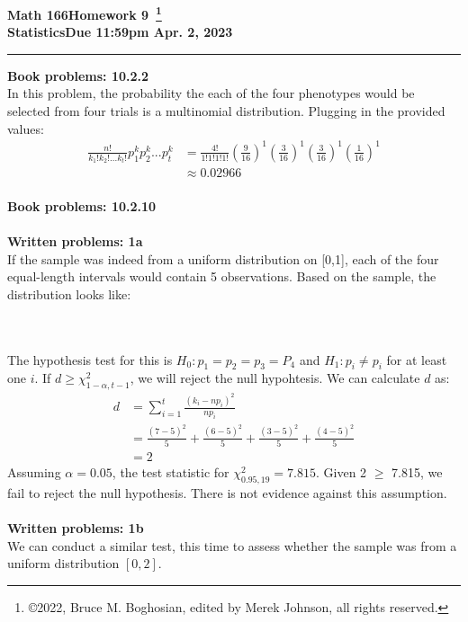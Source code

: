 \documentclass [12pt] {article}
\newcommand{\class}{Math 166}
\newcommand{\classname}{Statistics}
\newcommand{\assignment}{Homework 9}
\newcommand{\duedate}{Due 11:59pm Apr. 2, 2023}
\begin{document}
\thispagestyle{empty}

\noindent \textbf{\class \hfill \assignment~\footnote{\copyright 2022, Bruce M. Boghosian, edited by Merek Johnson, all rights reserved.}}\\
\textbf{\classname \hfill \duedate} \\
\rule[1ex]{\textwidth}{.1pt}
\textbf{Book problems: 10.2.2}\\
In this problem, the probability the each of the four phenotypes would be selected from four trials is a multinomial distribution. Plugging in the provided values:
\begin{align*}
\frac{n!}{k_1!k_2!... k_t!}p_1^kp_2^k...p_t^k
&= \frac{4!}{1!1!1!1!}\left(\frac{9}{16}\right)^1\left(\frac{3}{16}\right)^1\left(\frac{3}{16}\right)^1\left(\frac{1}{16}\right)^1\\
&\approx 0.02966
\end{align*}
\\
\textbf{Book problems: 10.2.10}\\
\\
\textbf{Written problems: 1a}\\
If the sample was indeed from a uniform distribution on [0,1], each of the four equal-length intervals would contain 5 observations. Based on the sample, the distribution looks like:\\
\\
\\	
The hypothesis test for this is $H_0: p_1 = p_2 = p_3 = P_4$ and $H_1: p_i \neq p_i$ for at least one $i$. If $d \geq \chi_{1-\alpha,t-1}^2$, we will reject the null hypohtesis. We can calculate $d$ as:
\begin{align*}
d
&= \sum_{i=1}^t\frac{(k_i-np_i)^2}{np_i}\\
&= \frac{(7-5)^2}{5}+\frac{(6-5)^2}{5}+\frac{(3-5)^2}{5}+\frac{(4-5)^2}{5}\\
&= 2
\end{align*}
Assuming $\alpha = 0.05$, the test statistic for $\chi_{0.95,19}^2 =  7.815$. Given 2 $\geq$ 7.815, we fail to reject the null hypothesis. There is not evidence against this assumption.\\
\\
\textbf{Written problems: 1b}\\
We can conduct a similar test, this time to assess whether the sample was from a uniform distribution $[0,2]$.
\end{document}
